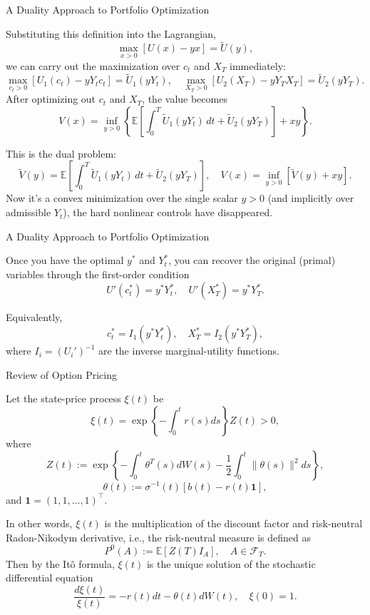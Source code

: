 \documentclass{beamer}
\begin{document}
\begin{frame}{A Duality Approach to Portfolio Optimization}

    {\footnotesize \footnotesize
    Substituting this definition into the Lagrangian,
\[
\max_{x>0} [U(x) - yx] = \tilde{U}(y),
\]
we can carry out the maximization over \( c_t \) and \( X_T \) immediately:
\[
\max_{c_t > 0} [U_1(c_t) - yY_t c_t] = \tilde{U}_1(yY_t), \quad \max_{X_T > 0} [U_2(X_T) - yY_T X_T] = \tilde{U}_2(yY_T).
\]
 \pause After optimizing out \( c_t \) and \( X_T \), the value becomes
\[
V(x) = \inf_{y>0} \left\{ \mathbb{E} \left[ \int_0^T \tilde{U}_1(yY_t) \, dt + \tilde{U}_2(yY_T) \right] + xy \right\}.
\]

This is the dual problem:
\[
\tilde{V}(y) = \mathbb{E} \left[ \int_0^T \tilde{U}_1(yY_t) \, dt + \tilde{U}_2(yY_T) \right], \quad V(x) = \inf_{y>0} [\tilde{V}(y) + xy].
\]
 \pause Now it's a convex minimization over the single scalar \( y > 0 \) (and implicitly over admissible \( Y_t \)), 
the hard nonlinear controls have disappeared.

    }
\end{frame}
\begin{frame}{A Duality Approach to Portfolio Optimization}

    {\footnotesize \footnotesize
     Once you have the optimal \( y^* \) and \( Y_t^* \), you can recover the original (primal) variables through the first-order condition
\[
U'(c_t^*) = y^* Y_t^*, \quad U'(X_T^*) = y^* Y_T^*.
\]

Equivalently,
\[
c_t^* = I_1(y^* Y_t^*), \quad X_T^* = I_2(y^* Y_T^*),
\]
where \( I_i = (U_i')^{-1} \) are the inverse marginal-utility functions.

    }
\end{frame}
\begin{frame}{Review of Option Pricing}

    {\footnotesize \footnotesize
     
Let the state-price process \(\xi(t)\) be
\[
\xi(t) = \exp \left\{ - \int_0^t r(s) ds \right\} Z(t) > 0,
\]
where
\[
Z(t) := \exp \left\{ - \int_0^t \theta^T (s) dW(s) - \frac{1}{2} \int_0^t \| \theta(s) \|^2 ds \right\},
\]
\[
\theta(t) := \sigma^{-1}(t) [b(t) - r(t)\mathbf{1}],
\]
and \(\mathbf{1} = (1, 1, \ldots, 1)^\top\). 
\par  \pause In other words, \(\xi(t)\) is the multiplication of the discount factor and risk-neutral Radon-Nikodym derivative, i.e., the risk-neutral measure is defined as
\[
P^0(A) := \mathbb{E}[Z(T)I_A], \quad A \in \mathcal{F}_T.
\]
 \pause Then by the Itô formula, \(\xi(t)\) is the unique solution of the stochastic differential equation
\[
\frac{d\xi(t)}{\xi(t)} = -r(t) dt - \theta(t) dW(t), \quad \xi(0) = 1.
\]
    }
\end{frame}
\end{document}
